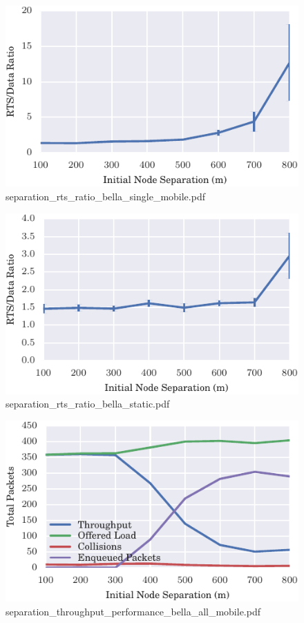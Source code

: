 \documentclass{article}
\begin{document}
\begin{figure}[h!]
\centering
\includegraphics[width=\linewidth]{separation_rts_ratio_bella_single_mobile.pdf}
\caption{separation\_rts\_ratio\_bella\_single\_mobile.pdf}
\end{figure}




\begin{figure}[h!]
\centering
\includegraphics[width=\linewidth]{separation_rts_ratio_bella_static.pdf}
\caption{separation\_rts\_ratio\_bella\_static.pdf}
\end{figure}




\begin{figure}[h!]
\centering
\includegraphics[width=\linewidth]{separation_throughput_performance_bella_all_mobile.pdf}
\caption{separation\_throughput\_performance\_bella\_all\_mobile.pdf}
\end{figure}
\end{document}
